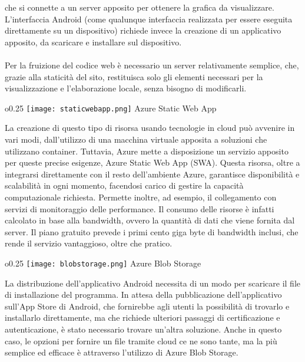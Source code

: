 che si connette a un server apposito
per ottenere la grafica da visualizzare.
L'interfaccia Android
(come qualunque interfaccia realizzata per essere eseguita direttamente su un dispositivo)
richiede invece la creazione di un applicativo apposito,
da scaricare e installare sul dispositivo.\\
\\
Per la fruizione del codice web è necessario un server relativamente semplice,
che, grazie alla staticità del sito,
restituisca solo gli elementi necessari per la visualizzazione e l'elaborazione locale,
senza bisogno di modificarli.
\clearpage
\begin{wrapfigure}{o}{0.25\textwidth}
    \centering
    \texttt{[image: staticwebapp.png]}
    Azure Static Web App
\end{wrapfigure}La creazione di questo tipo di risorsa usando
tecnologie in cloud può avvenire in vari modi,
dall'utilizzo di una macchina virtuale apposita
a soluzioni che utilizzano container.
Tuttavia, Azure mette a disposizione un servizio apposito per queste precise esigenze,
Azure Static Web App (SWA).\newline
Questa risorsa,
oltre a integrarsi direttamente con il resto dell'ambiente Azure,
garantisce disponibilità e scalabilità in ogni momento,
facendosi carico di gestire la capacità computazionale richiesta.
Permette inoltre, ad esempio,
il collegamento con servizi di monitoraggio delle performance.
Il consumo delle risorse è infatti calcolato in base alla bandwidth,
ovvero la quantità di dati che viene fornita dal server.
Il piano gratuito prevede i primi cento giga byte di bandwidth inclusi,
che rende il servizio vantaggioso, oltre che pratico.\newline
\par
\begin{wrapfigure}{o}{0.25\textwidth}
    \centering
    \texttt{[image: blobstorage.png]}
    Azure Blob Storage
\end{wrapfigure}
La distribuzione dell'applicativo Android
necessita di un modo per scaricare il file di installazione del programma.
In attesa della pubblicazione dell'applicativo sull'App Store di Android,
che fornirebbe agli utenti la possibilità di trovarlo e installarlo direttamente,
ma che richiede ulteriori passaggi di certificazione e autenticazione,
è stato necessario trovare un'altra soluzione.
Anche in questo caso,
le opzioni per fornire un file tramite cloud ce ne sono tante,
ma la più semplice ed efficace è attraverso l'utilizzo di Azure Blob Storage.\\
